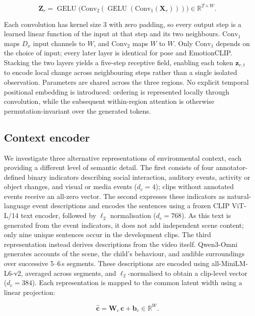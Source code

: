 \documentclass[11pt]{article}
\newcommand{\R}{\mathbb{R}}
\newcommand{\vc}{\mathbf{c}}
\newcommand{\vchat}{\hat{\mathbf{c}}}
\newcommand{\vb}{\mathbf{b}}
\newcommand{\mZ}{\mathbf{Z}}
\newcommand{\mX}{\mathbf{X}}
\newcommand{\mW}{\mathbf{W}}
\newcommand{\GELU}{\operatorname{GELU}}
\begin{document}
\begin{equation}
  \mZ_r = \GELU\!\big(\mathrm{Conv}_2(\GELU(\mathrm{Conv}_1(\mX_r)))\big)\in\R^{T\times W}.
\end{equation}

Each convolution has kernel size 3 with zero padding, so every output step is a learned linear function of the input at that step and its two neighbours. $\mathrm{Conv}_1$ maps $D_x$ input channels to $W$, and $\mathrm{Conv}_2$ maps $W$ to $W$. Only $\mathrm{Conv}_1$ depends on the choice of input; every later layer is identical for pose and EmotionCLIP. Stacking the two layers yields a five-step receptive field, enabling each token $\mathbf{z}_{r,t}$ to encode local change across neighbouring steps rather than a single isolated observation. Parameters are shared across the three regions. No explicit temporal positional embedding is introduced: ordering is represented locally through convolution, while the subsequent within-region attention is otherwise permutation-invariant over the generated tokens.

\subsection{Context encoder}
\label{sec:context}

We investigate three alternative representations of environmental context, each providing a different level of semantic detail. The first consists of four annotator-defined binary indicators describing social interaction, auditory events, activity or object changes, and visual or media events ($d_c=4$); clips without annotated events receive an all-zero vector. The second expresses these indicators as natural-language event descriptions and encodes the sentences using a frozen CLIP ViT-L/14 text encoder, followed by $\ell_2$ normalisation ($d_c=768$). As this text is generated from the event indicators, it does not add independent scene content; only nine unique sentences occur in the development clips. The third representation instead derives descriptions from the video itself. Qwen3-Omni generates accounts of the scene, the child's behaviour, and audible surroundings over successive 5--6\,s segments. These descriptions are encoded using all-MiniLM-L6-v2, averaged across segments, and $\ell_2$-normalised to obtain a clip-level vector ($d_c=384$). Each representation is mapped to the common latent width using a linear projection:

\begin{equation}
  \vchat = \mW_c\,\vc + \vb_c\in\R^{W}.
\end{equation}
\end{document}
